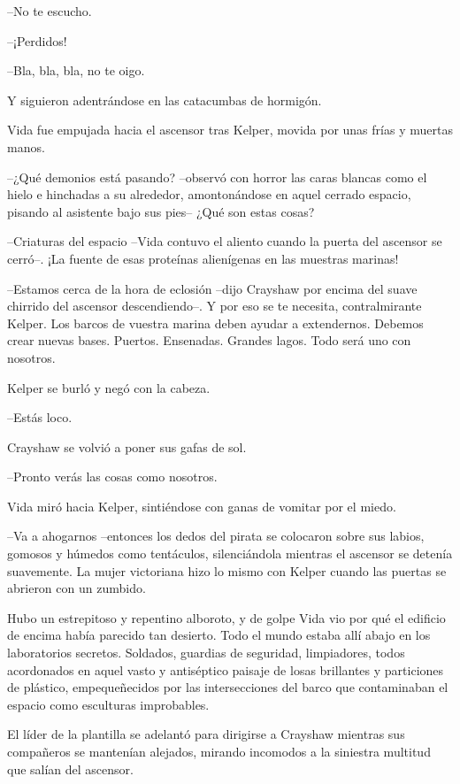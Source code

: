 {--No te escucho.}

{--¡Perdidos!}

{--Bla, bla, bla, no te oigo.}

{Y siguieron adentrándose en las catacumbas de hormigón.}

\mbox{}

{Vida fue empujada hacia el ascensor tras Kelper, movida por unas frías
y muertas manos.}

{--¿Qué demonios está pasando? --observó con horror las caras blancas
 como el hielo e hinchadas a su alrededor, amontonándose en aquel cerrado
espacio, pisando al asistente bajo sus pies-- ¿Qué son estas cosas?}

{--Criaturas del espacio --Vida contuvo el aliento cuando la puerta del
 ascensor se cerró--. ¡La fuente de esas proteínas alienígenas en las
muestras marinas!}

{--Estamos cerca de la hora de eclosión --dijo Crayshaw por encima del
 suave chirrido del ascensor descendiendo--. Y por eso se te necesita,
 contralmirante Kelper. Los barcos de vuestra marina deben ayudar a
 extendernos. Debemos crear nuevas bases. Puertos. Ensenadas. Grandes
lagos. Todo será uno con nosotros.}

{Kelper se burló y negó con la cabeza.}

{--Estás loco.}

{Crayshaw se volvió a poner sus gafas de sol.}

{--Pronto verás las cosas como nosotros.}

{Vida miró hacia Kelper, sintiéndose con ganas de vomitar por el miedo.}

{--Va a ahogarnos --entonces los dedos del pirata se colocaron sobre sus
 labios, gomosos y húmedos como tentáculos, silenciándola mientras el
 ascensor se detenía suavemente. La mujer victoriana hizo lo mismo con
Kelper cuando las puertas se abrieron con un zumbido.}

{Hubo un estrepitoso y repentino alboroto, y de golpe Vida vio por qué
 el edificio de encima había parecido tan desierto. Todo el mundo estaba
 allí abajo en los laboratorios secretos. Soldados, guardias de
 seguridad, limpiadores, todos acordonados en aquel vasto y antiséptico
 paisaje de losas brillantes y particiones de plástico, empequeñecidos
 por las intersecciones del barco que contaminaban el espacio como
esculturas improbables.}

{El líder de la plantilla se adelantó para dirigirse a Crayshaw mientras
 sus compañeros se mantenían alejados, mirando incomodos a la siniestra
multitud que salían del ascensor.}

